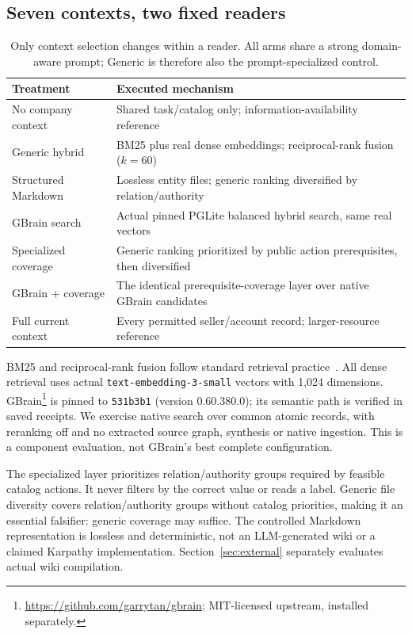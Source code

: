 \subsection{Seven contexts, two fixed readers}
\begin{table}[t]
\centering\small
\begin{tabularx}{\linewidth}{@{}p{.21\linewidth}X@{}}
\toprule
Treatment & Executed mechanism \\
\midrule
No company context & Shared task/catalog only; information-availability reference \\
Generic hybrid & BM25 plus real dense embeddings; reciprocal-rank fusion ($k=60$) \\
Structured Markdown & Lossless entity files; generic ranking diversified by relation/authority \\
GBrain search & Actual pinned PGLite balanced hybrid search, same real vectors \\
Specialized coverage & Generic ranking prioritized by public action prerequisites, then diversified \\
GBrain + coverage & The identical prerequisite-coverage layer over native GBrain candidates \\
Full current context & Every permitted seller/account record; larger-resource reference \\
\bottomrule
\end{tabularx}
\caption{Only context selection changes within a reader. All arms share a strong domain-aware prompt; Generic is therefore also the prompt-specialized control.}
\label{tab:arms}
\end{table}

BM25 and reciprocal-rank fusion follow standard retrieval practice~\citep{robertson2009,cormack2009}. All dense retrieval uses actual \texttt{text-embedding-3-small} vectors with 1,024 dimensions. GBrain\footnote{\url{https://github.com/garrytan/gbrain}; MIT-licensed upstream, installed separately.} is pinned to \texttt{531b3b1} (version 0.60.380.0); its semantic path is verified in saved receipts. We exercise native search over common atomic records, with reranking off and no extracted source graph, synthesis or native ingestion. This is a component evaluation, not GBrain's best complete configuration.

The specialized layer prioritizes relation/authority groups required by feasible catalog actions. It never filters by the correct value or reads a label. Generic file diversity covers relation/authority groups without catalog priorities, making it an essential falsifier: generic coverage may suffice. The controlled Markdown representation is lossless and deterministic, not an LLM-generated wiki or a claimed Karpathy implementation. Section~\ref{sec:external} separately evaluates actual wiki compilation.

